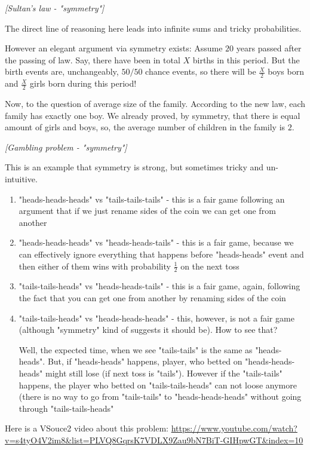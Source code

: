 %
\filbreak
\begin{problem}
\textit{[Sultan's law - "symmetry"]}

The direct line of reasoning here leads into infinite sums and tricky probabilities. 

However an elegant argument via symmetry exists:
Assume $20$ years passed after the passing of law. Say, there have been in total $X$ births in this period. But the birth events are, unchangeably, $50/50$ chance events, so there will be $\frac{X}{2}$ boys born and $\frac{X}{2}$ girls born during this period!

Now, to the question of average size of the family. According to the new law, each family has exactly one boy.   We already proved, by symmetry, that there is equal amount of girls and boys, so, the average number of children in the family is $2$.

\end{problem}
%


\begin{problem}
\textit{[Gambling problem - "symmetry"]}

This is an example that symmetry is strong, but sometimes tricky and un-intuitive.

\begin{enumerate}
\item "heads-heads-heads" vs "tails-tails-tails" - this is a fair game following an argument that if we just rename sides of the coin we can get one from another
\item "heads-heads-heads" vs "heads-heads-tails" - this is a fair game, because we can effectively ignore everything that happens before "heads-heads" event and then either of them wins with probability $\frac{1}{2}$ on the next toss
\item "tails-tails-heads" vs "heads-heads-tails" - this is a fair game, again, following the fact that you can get one from another by renaming sides of the coin
\item "tails-tails-heads" vs "heads-heads-heads" - this, however, is not a fair game (although "symmetry" kind of suggests it should be). How to see that? 

Well, the expected time, when we see "tails-tails" is the same as "heads-heads". 
But, if "heads-heads" happens, player, who betted on "heads-heads-heads" might still lose (if next toss is "tails"). 
However if the "tails-tails" happens, the player who betted on "tails-tails-heads" can not loose anymore (there is no way to go from "tails-tails" to "heads-heads-heads" without going through "tails-tails-heads"
\end{enumerate}

Here is a VSouce2 video about this problem: \url{https://www.youtube.com/watch?v=s4tyO4V2im8&list=PLVQ8GqrsK7VDLX9Zau9bN7BiT-GIHpwGT&index=10}
\end{problem}
%

